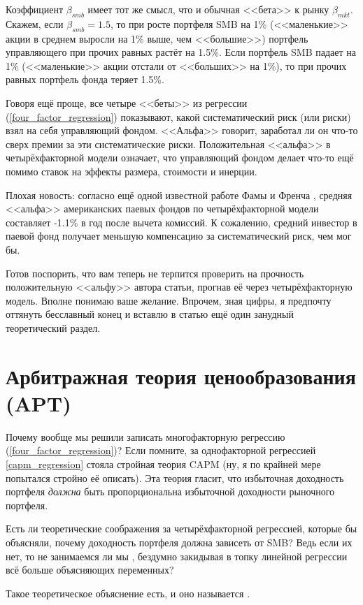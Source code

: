 Коэффициент $\beta_{smb}$ имеет тот же смысл, что и обычная <<бета>> к рынку $\beta_{mkt}$. Скажем, если $\beta_{smb}=1.5$, то при росте портфеля SMB на 1\% (<<маленькие>> акции в среднем выросли на 1\% выше, чем <<большие>>) портфель управляющего при прочих равных растёт на 1.5\%. Если портфель SMB падает на 1\% (<<маленькие>> акции отстали от <<больших>> на 1\%), то при прочих равных портфель фонда теряет 1.5\%.

Говоря ещё проще, все четыре <<беты>> из регрессии (\ref{four_factor_regression}) показывают, какой систематический риск (или риски) взял на себя управляющий фондом. <<Альфа>> говорит, заработал ли он что-то сверх премии за эти систематические риски. Положительная <<альфа>> в четырёхфакторной модели означает, что управляющий фондом делает что-то ещё помимо ставок на эффекты размера, стоимости и инерции.

Плохая новость: согласно ещё одной известной работе Фамы и Френча \cite{fama2010luck}, средняя <<альфа>> американских паевых фондов по четырёхфакторной модели составляет -1.1\% в год после вычета комиссий. К сожалению, средний инвестор в паевой фонд получает меньшую компенсацию за систематический риск, чем мог бы.

Готов поспорить, что вам теперь не терпится проверить на прочность положительную <<альфу>> автора статьи, прогнав её через четырёхфакторную модель. Вполне понимаю ваше желание. Впрочем, зная цифры, я предпочту оттянуть бесславный конец и вставлю в статью ещё один занудный теоретический раздел.

\section{Арбитражная теория ценообразования (APT)}

Почему вообще мы решили записать многофакторную регрессию (\ref{four_factor_regression})? Если помните, за однофакторной регрессией \ref{capm_regression} стояла стройная теория CAPM (ну, я по крайней мере попытался стройно её описать). Эта теория гласит, что избыточная доходность портфеля \emph{должна} быть пропорциональна избыточной доходности рыночного портфеля.

Есть ли теоретические соображения за четырёхфакторной регрессией, которые бы объясняли, почему доходность портфеля должна зависеть от SMB? Ведь если их нет, то не занимаемся ли мы , бездумно закидывая в топку линейной регрессии всё больше объясняющих переменных?

Такое теоретическое объяснение есть, и оно называется .

